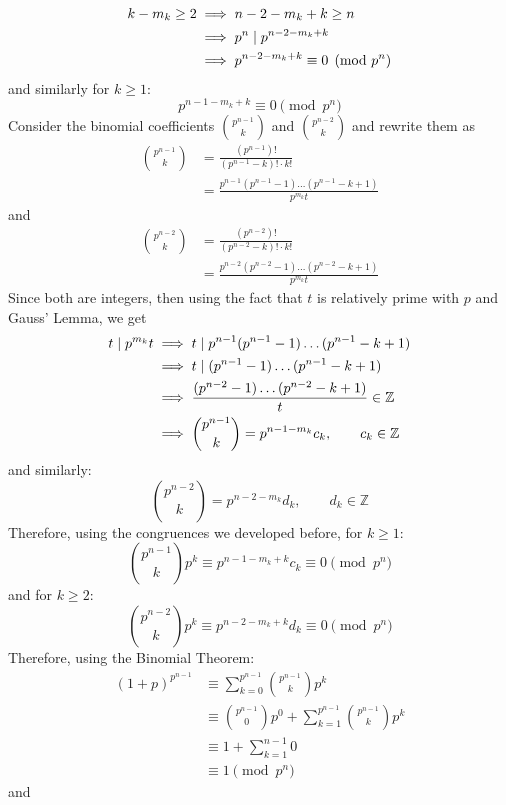 \begin{solution}
\begin{align*}
        k - m_k \geq 2 &\implies n - 2 - m_k + k \geq n \\
        &\implies p^n \mathrel{|} p^{n - 2 - m_k + k} \\
        &\implies p^{n - 2 - m_k + k} \equiv 0 \pmod{p^n}
    \end{align*}
    and similarly for $k \geq 1$:
    $$p^{n - 1 - m_k + k} \equiv 0 \pmod{p^n}$$
    Consider the binomial coefficients $\binom{p^{n-1}}{k}$ and $\binom{p^{n-2}}{k}$ and rewrite them as
    \begin{align*}
        \binom{p^{n-1}}{k} &= \frac{(p^{n-1})!}{(p^{n-1}-k)! \cdot k!} \\
        &= \frac{p^{n-1}(p^{n-1}-1)\dots(p^{n-1}-k +1)}{p^{m_k}t}
    \end{align*}
    and
    \begin{align*}
        \binom{p^{n-2}}{k} &= \frac{(p^{n-2})!}{(p^{n-2}-k)! \cdot k!} \\
        &= \frac{p^{n-2}(p^{n-2}-1)\dots(p^{n-2}-k +1)}{p^{m_k}t} 
    \end{align*}
    Since both are integers, then using the fact that $t$ is relatively prime with $p$ and Gauss' Lemma, we get
    \begin{align*}
        t \mathrel{|} p^{m_k}t &\implies t \mathrel{|} p^{n-1}(p^{n-1}-1)\dots(p^{n-1}-k +1) \\
        &\implies t \mathrel{|} (p^{n-1}-1)\dots(p^{n-1}-k +1) \\
        &\implies \frac{(p^{n-2}-1)\dots(p^{n-2}-k +1)}{t} \in \mathbb{Z} \\
        &\implies \binom{p^{n-1}}{k} = p^{n-1-m_k}c_k, \qquad c_k \in \mathbb{Z}
    \end{align*}
    and similarly:
    $$\binom{p^{n-2}}{k} = p^{n-2-m_k}d_k, \qquad d_k \in \mathbb{Z}$$
    Therefore, using the congruences we developed before, for $k \geq 1$:
    $$\binom{p^{n-1}}{k}p^k \equiv p^{n-1-m_k +k}c_k \equiv 0 \pmod{p^n}$$
    and for $k \geq 2$:
    $$\binom{p^{n-2}}{k}p^k \equiv p^{n-2-m_k +k}d_k \equiv 0 \pmod{p^n}$$
    Therefore, using the Binomial Theorem:
    \begin{align*}
        (1+p)^{p^{n-1}} &\equiv \sum_{k=0}^{p^{n-1}}\binom{p^{n-1}}{k}p^k \\
        &\equiv \binom{p^{n-1}}{0}p^0 + \sum_{k=1}^{p^{n-1}}\binom{p^{n-1}}{k}p^k\\
        &\equiv 1 + \sum_{k=1}^{n-1}0 \\
        &\equiv 1 \pmod{p^n}
    \end{align*}
    and 
    \begin{align*}

\end{align*}
\end{solution}
